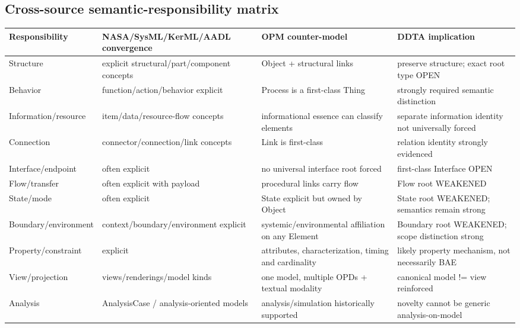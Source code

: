 \documentclass[10pt,a4paper]{article}
\begin{document}
\begin{landscape}
\section{Cross-source semantic-responsibility matrix}
\scriptsize
\begin{longtable}{p{3.0cm}p{6.0cm}p{5.0cm}p{7.0cm}}
\toprule Responsibility & NASA/SysML/KerML/AADL convergence & OPM counter-model & DDTA implication\\\midrule\endhead
Structure & explicit structural/part/component concepts & Object + structural links & preserve structure; exact root type OPEN\\
Behavior & function/action/behavior explicit & Process is a first-class Thing & strongly required semantic distinction\\
Information/resource & item/data/resource-flow concepts & informational essence can classify elements & separate information identity not universally forced\\
Connection & connector/connection/link concepts & Link is first-class & relation identity strongly evidenced\\
Interface/endpoint & often explicit & no universal interface root forced & first-class Interface OPEN\\
Flow/transfer & often explicit with payload & procedural links carry flow & Flow root WEAKENED\\
State/mode & often explicit & State explicit but owned by Object & State root WEAKENED; semantics remain strong\\
Boundary/environment & context/boundary/environment explicit & systemic/environmental affiliation on any Element & Boundary root WEAKENED; scope distinction strong\\
Property/constraint & explicit & attributes, characterization, timing and cardinality & likely property mechanism, not necessarily BAE\\
View/projection & views/renderings/model kinds & one model, multiple OPDs + textual modality & canonical model != view reinforced\\
Analysis & AnalysisCase / analysis-oriented models & analysis/simulation historically supported & novelty cannot be generic analysis-on-model\\
\bottomrule
\end{longtable}
\end{landscape}
\end{document}
